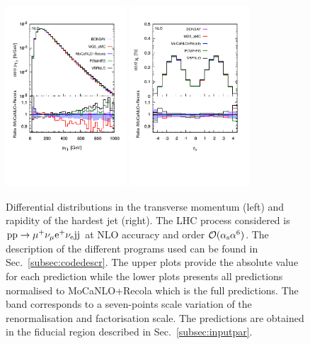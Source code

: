  \begin{figure}[hbt!]
   \centering
   \includegraphics[width=0.4\textwidth,angle=0,clip=true,trim={0.4cm 2cm 0.cm 1.cm}]{figures/NLO/ptj1_NLO.pdf}
   \includegraphics[width=0.4\textwidth,angle=0,clip=true,trim={0.4cm 2cm 0.cm 1.cm}]{figures/NLO/yj1_NLO.pdf}
\caption{\label{fig:distNLO2} Differential distributions in the transverse momentum (left) and rapidity of the hardest jet (right).
The LHC process considered is ${\rm p}{\rm p}\to\mu^+\nu_\mu{\rm e}^+\nu_{\rm e}{\rm j}{\rm j}$ at NLO accuracy and order $\mathcal{O}(\alpha_{\rm s}\alpha^6)$.
The description of the different programs used can be found in Sec.~\ref{subsec:codedescr}.
The upper plots provide the absolute value for each prediction while the lower plots presents all predictions normalised to {\sc MoCaNLO}+{\sc Recola} which is the full predictions.
The band corresponds to a seven-points scale variation of the renormalisation and factorisation scale.
The predictions are obtained in the fiducial region described in Sec.~\ref{subsec:inputpar}.
}
\end{figure}

